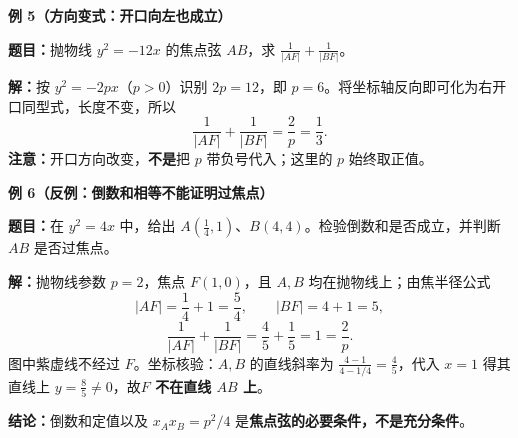 \clearpage
\begin{examplebox}
\textbf{\textcolor{CExample}{例 5（方向变式：开口向左也成立）}}

\textbf{题目：}抛物线 $y^2=-12x$ 的焦点弦 $AB$，求 $\frac1{|AF|}+\frac1{|BF|}$。

\textbf{解：}按 $y^2=-2px$（$p>0$）识别 $2p=12$，即 $p=6$。将坐标轴反向即可化为右开口同型式，长度不变，所以
\[
 \boxed{\frac1{|AF|}+\frac1{|BF|}=\frac2p=\frac13}.
\]
\textbf{注意：}开口方向改变，\textbf{不是}把 $p$ 带负号代入；这里的 $p$ 始终取正值。

\medskip
\end{examplebox}
\clearpage
\begin{examplebox}
\begin{center}\end{center}
\textbf{\textcolor{CExample}{例 6（反例：倒数和相等不能证明过焦点）}}

\textbf{题目：}在 $y^2=4x$ 中，给出 $A(\frac14,1)$、$B(4,4)$。检验倒数和是否成立，并判断 $AB$ 是否过焦点。

\textbf{解：}抛物线参数 $p=2$，焦点 $F(1,0)$，且 $A,B$ 均在抛物线上；由焦半径公式
\[
 |AF|=\frac14+1=\frac54,\qquad |BF|=4+1=5,
\]
\[
 \frac1{|AF|}+\frac1{|BF|}=\frac45+\frac15=1=\frac2p.
\]
图中紫虚线不经过 $F$。坐标核验：$A,B$ 的直线斜率为 $\frac{4-1}{4-1/4}=\frac45$，代入 $x=1$ 得其直线上 $y=\frac85\ne0$，故\textbf{$F$ 不在直线 $AB$ 上}。

\textbf{结论：}倒数和定值以及 $x_Ax_B=p^2/4$ 是\textbf{焦点弦的必要条件，不是充分条件}。
\end{examplebox}
